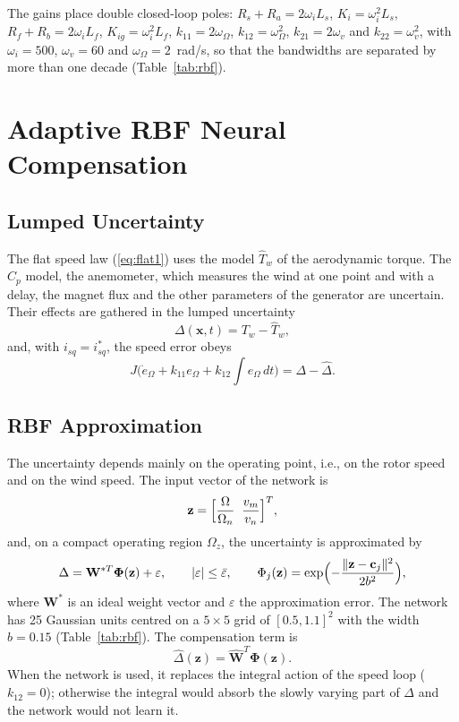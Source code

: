 \documentclass[11pt,a4paper]{article}
\newcommand{\bv}[1]{\mathbf{#1}}
\begin{document}
The gains place double closed-loop poles: $R_s+R_a=2\omega_iL_s$, $K_i=\omega_i^2L_s$,
$R_f+R_b=2\omega_iL_f$, $K_{ig}=\omega_i^2L_f$, $k_{11}=2\omega_\Omega$, $k_{12}=\omega_\Omega^2$,
$k_{21}=2\omega_v$ and $k_{22}=\omega_v^2$, with $\omega_i=500$, $\omega_v=60$ and $\omega_\Omega=2$~rad/s,
so that the bandwidths are separated by more than one decade (Table~\ref{tab:rbf}).

\section{Adaptive RBF Neural Compensation}
\subsection{Lumped Uncertainty}
The flat speed law (\ref{eq:flat1}) uses the model $\hat T_w$ of the aerodynamic torque. The $C_p$
model, the anemometer, which measures the wind at one point and with a delay, the magnet flux and the
other parameters of the generator are uncertain. Their effects are gathered in the lumped uncertainty
\begin{equation}
\Delta(\bv{x},t)=T_w-\hat T_w ,
\end{equation}
and, with $i_{sq}=i_{sq}^*$, the speed error obeys
\begin{equation}
J\bigl(\dot e_\Omega + k_{11}e_\Omega + k_{12}\!\textstyle\int\! e_\Omega\,dt\bigr) = \Delta-\hat\Delta .
\label{eq:errw}
\end{equation}

\subsection{RBF Approximation}
The uncertainty depends mainly on the operating point, i.e., on the rotor speed and on the wind speed.
The input vector of the network is
\begin{equation}
\bv{z}=\Bigl[\frac{\Omega}{\Omega_n}\;\;\frac{v_m}{v_n}\Bigr]^T ,
\label{eq:z}
\end{equation}
and, on a compact operating region $\Omega_z$, the uncertainty is approximated by~\cite{park1991}
\begin{equation}
\Delta=\bv{W}^{*T}\boldsymbol\Phi(\bv{z})+\varepsilon,\qquad |\varepsilon|\le\bar\varepsilon ,\qquad
\Phi_j(\bv{z})=\exp\Bigl(-\frac{\|\bv{z}-\bv{c}_j\|^2}{2b^2}\Bigr),
\label{eq:approx}
\end{equation}
where $\bv{W}^*$ is an ideal weight vector and $\varepsilon$ the approximation error. The network has 25
Gaussian units centred on a $5\times5$ grid of $[0.5,1.1]^2$ with the width $b=0.15$
(Table~\ref{tab:rbf}). The compensation term is
\begin{equation}
\hat\Delta(\bv{z})=\hat{\bv{W}}^T\boldsymbol\Phi(\bv{z}) .
\label{eq:dh}
\end{equation}
When the network is used, it replaces the integral action of the speed loop ($k_{12}=0$); otherwise the
integral would absorb the slowly varying part of $\Delta$ and the network would not learn it.
\end{document}

